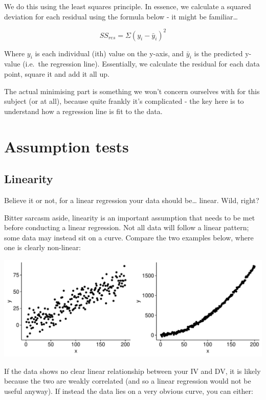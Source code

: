 \documentclass[
]{book}
\begin{document}
We do this using the least squares principle. In essence, we calculate a squared deviation for each residual using the formula below - it might be familiar\ldots{}

\[
SS_{res} = \Sigma (y_i - \bar y_i)^2
\]

Where \(y_i\) is each individual (ith) value on the y-axis, and \(\bar y_i\) is the predicted y-value (i.e.~the regression line). Essentially, we calculate the residual for each data point, square it and add it all up.

The actual minimising part is something we won't concern ourselves with for this subject (or at all), because quite frankly it's complicated - the key here is to understand how a regression line is fit to the data.

\section{Assumption tests}\label{assumption-tests}

\subsection{Linearity}\label{linearity}

Believe it or not, for a linear regression your data should be\ldots{} linear. Wild, right?

Bitter sarcasm aside, linearity is an important assumption that needs to be met before conducting a linear regression. Not all data will follow a linear pattern; some data may instead sit on a curve. Compare the two examples below, where one is clearly non-linear:

\begin{center}\includegraphics{_main_files/figure-latex/unnamed-chunk-205-1} \end{center}

If the data shows no clear linear relationship between your IV and DV, it is likely because the two are weakly correlated (and so a linear regression would not be useful anyway). If instead the data lies on a very obvious curve, you can either:
\end{document}
